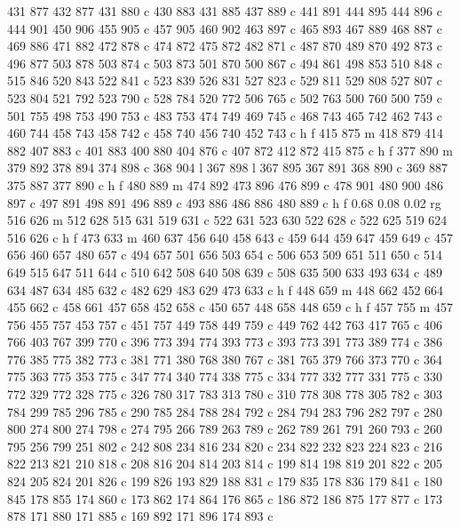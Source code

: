 {{   431 877 432 877 431 880 c
   430 883 431 885 437 889 c
   441 891 444 895 444 896 c
   444 901 450 906 455 905 c
   457 905 460 902 463 897 c
   465 893 467 889 468 887 c
   469 886 471 882 472 878 c
   474 872 475 872 482 871 c
   487 870 489 870 492 873 c
   496 877 503 878 503 874 c
   503 873 501 870 500 867 c
   494 861 498 853 510 848 c
   515 846 520 843 522 841 c
   523 839 526 831 527 823 c
   529 811 529 808 527 807 c
   523 804 521 792 523 790 c
   528 784 520 772 506 765 c
   502 763 500 760 500 759 c
   501 755 498 753 490 753 c
   483 753 474 749 469 745 c
   468 743 465 742 462 743 c
   460 744 458 743 458 742 c
   458 740 456 740 452 743 c
   h f
   415 875 m
   418 879 414 882 407 883 c
   401 883 400 880 404 876 c
   407 872 412 872 415 875 c
   h f
   377 890 m
   379 892 378 894 374 898 c
   368 904 l
   367 898 l
   367 895 367 891 368 890 c
   369 887 375 887 377 890 c
   h f
   480 889 m
   474 892 473 896 476 899 c
   478 901 480 900 486 897 c
   497 891 498 891 496 889 c
   493 886 486 886 480 889 c
   h f
   0.68 0.08 0.02 rg
   516 626 m
   512 628 515 631 519 631 c
   522 631 523 630 522 628 c
   522 625 519 624 516 626 c
   h f
   473 633 m
   460 637 456 640 458 643 c
   459 644 459 647 459 649 c
   457 656 460 657 480 657 c
   494 657 501 656 503 654 c
   506 653 509 651 511 650 c
   514 649 515 647 511 644 c
   510 642 508 640 508 639 c
   508 635 500 633 493 634 c
   489 634 487 634 485 632 c
   482 629 483 629 473 633 c
   h f
   448 659 m
   448 662 452 664 455 662 c
   458 661 457 658 452 658 c
   450 657 448 658 448 659 c
   h f
   457 755 m
   457 756 455 757 453 757 c
   451 757 449 758 449 759 c
   449 762 442 763 417 765 c
   406 766 403 767 399 770 c
   396 773 394 774 393 773 c
   393 773 391 773 389 774 c
   386 776 385 775 382 773 c
   381 771 380 768 380 767 c
   381 765 379 766 373 770 c
   364 775 363 775 353 775 c
   347 774 340 774 338 775 c
   334 777 332 777 331 775 c
   330 772 329 772 328 775 c
   326 780 317 783 313 780 c
   310 778 308 778 305 782 c
   303 784 299 785 296 785 c
   290 785 284 788 284 792 c
   284 794 283 796 282 797 c
   280 800 274 800 274 798 c
   274 795 266 789 263 789 c
   262 789 261 791 260 793 c
   260 795 256 799 251 802 c
   242 808 234 816 234 820 c
   234 822 232 823 224 823 c
   216 822 213 821 210 818 c
   208 816 204 814 203 814 c
   199 814 198 819 201 822 c
   205 824 205 824 201 826 c
   199 826 193 829 188 831 c
   179 835 178 836 179 841 c
   180 845 178 855 174 860 c
   173 862 174 864 176 865 c
   186 872 186 875 177 877 c
   173 878 171 880 171 885 c
   169 892 171 896 174 893 c
}}
